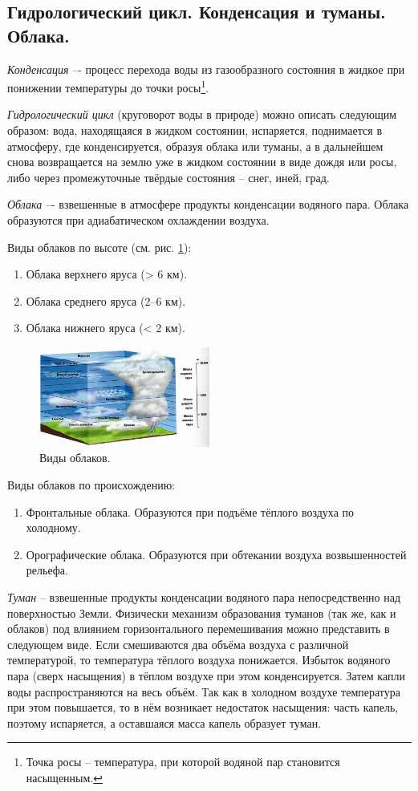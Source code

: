 \subsection{Гидрологический цикл. Конденсация и туманы. Облака.}
\textit{Конденсация} –- процесс перехода воды из газообразного состояния в жидкое при понижении температуры до точки росы\footnote{Точка росы -- температура, при которой водяной пар становится насыщенным.}.

\textit{Гидрологический цикл} (круговорот воды в природе) можно описать следующим образом: вода, находящаяся в жидком состоянии, испаряется, поднимается в атмосферу, где конденсируется, образуя облака или туманы, а в дальнейшем снова возвращается на землю уже в жидком состоянии в виде дождя или росы, либо через промежуточные твёрдые состояния – снег, иней, град.

\textit{Облака} –- взвешенные в атмосфере продукты конденсации водяного пара.
Облака образуются при адиабатическом охлаждении воздуха.

Виды облаков по высоте (см. рис. \ref{fig:clouds}):
\begin{enumerate}
\item Облака верхнего яруса (> 6 км).
\item Облака среднего яруса (2--6 км).
\item Облака нижнего яруса (< 2 км).
\end{enumerate}

\begin{figure}[!ht]
\centering
\includegraphics[width=0.5\textwidth]{images/clouds.png}
\caption{Виды облаков.}\label{fig:clouds}
\end{figure}

Виды облаков по происхождению:
\begin{enumerate}
\item Фронтальные облака. Образуются при подъёме тёплого воздуха по холодному.
\item Орографические облака. Образуются при обтекании воздуха возвышенностей рельефа.
\end{enumerate}

\textit{Туман} -- взвешенные продукты конденсации водяного пара непосредственно над поверхностью Земли.
Физически механизм образования туманов (так же, как и облаков) под влиянием горизонтального перемешивания можно представить в следующем виде.
Если смешиваются два объёма воздуха с различной температурой, то температура тёплого воздуха понижается. Избыток водяного пара (сверх насыщения) в тёплом воздухе при этом конденсируется.
Затем капли воды распространяются на весь объём.
Так как в холодном воздухе температура при этом повышается, то в нём возникает недостаток насыщения: часть капель, поэтому испаряется, а оставшаяся масса капель образует туман.

